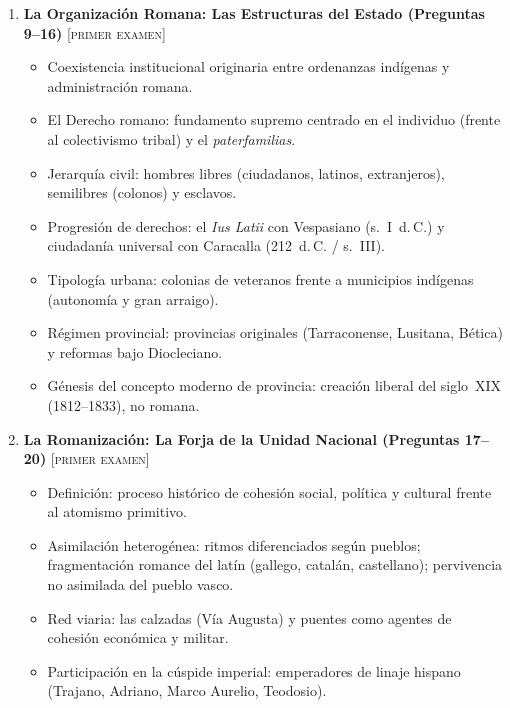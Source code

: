 \documentclass[11pt,letterpaper]{article}
\begin{document}
\begin{enumerate}[label=\textbf{\Roman*.}, leftmargin=1.5em, itemsep=0.5em]
\begin{enumerate}[label=\textbf{\Alph*.}, leftmargin=1.4em, itemsep=0.35em]
    \item \textbf{La Organización Romana: Las Estructuras del Estado (Preguntas 9--16)} \hfill {\footnotesize\color{goodingCrimson}\textsc{[primer examen]}}
    \begin{itemize}[leftmargin=1.2em, itemsep=0.15em]
      \item Coexistencia institucional originaria entre ordenanzas indígenas y administración romana.
      \item El Derecho romano: fundamento supremo centrado en el individuo (frente al colectivismo tribal) y el \emph{paterfamilias}.
      \item Jerarquía civil: hombres libres (ciudadanos, latinos, extranjeros), semilibres (colonos) y esclavos.
      \item Progresión de derechos: el \emph{Ius Latii} con Vespasiano (s.~I~d.\,C.) y ciudadanía universal con Caracalla (212~d.\,C. / s.~III).
      \item Tipología urbana: colonias de veteranos frente a municipios indígenas (autonomía y gran arraigo).
      \item Régimen provincial: provincias originales (Tarraconense, Lusitana, Bética) y reformas bajo Diocleciano.
      \item Génesis del concepto moderno de provincia: creación liberal del siglo~XIX (1812--1833), no romana.
    \end{itemize}

    \item \textbf{La Romanización: La Forja de la Unidad Nacional (Preguntas 17--20)} \hfill {\footnotesize\color{goodingCrimson}\textsc{[primer examen]}}
    \begin{itemize}[leftmargin=1.2em, itemsep=0.15em]
      \item Definición: proceso histórico de cohesión social, política y cultural frente al atomismo primitivo.
      \item Asimilación heterogénea: ritmos diferenciados según pueblos; fragmentación romance del latín (gallego, catalán, castellano); pervivencia no asimilada del pueblo vasco.
      \item Red viaria: las calzadas (Vía Augusta) y puentes como agentes de cohesión económica y militar.
      \item Participación en la cúspide imperial: emperadores de linaje hispano (Trajano, Adriano, Marco Aurelio, Teodosio).
    \end{itemize}
  \end{enumerate}


\end{enumerate}
\end{document}
